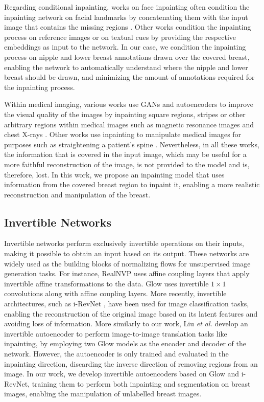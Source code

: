 Regarding conditional inpainting, works on face inpainting often condition the inpainting network on facial landmarks by concatenating them with the input image that contains the missing regions \cite{sun2018natural, yang2020generative, hong2024conditional}. Other works condition the inpainting process on reference images \cite{lim2023image} or on textual cues \cite{xie2023smartbrush} by providing the respective embeddings as input to the network. In our case, we condition the inpainting process on nipple and lower breast annotations drawn over the covered breast, enabling the network to automatically understand where the nipple and lower breast should be drawn, and minimizing the amount of annotations required for the inpainting process. 

Within medical imaging, various works use GANs and autoencoders to improve the visual quality of the images by inpainting square regions, stripes or other arbitrary regions within medical images such as magnetic resonance images \cite{armanious2019adversarial, chai2020mri, armanious2020ipa} and chest X-rays \cite{tran2020deep}. Other works use inpainting to manipulate medical images for purposes such as straightening a patient's spine \cite{bukas2021patient}. Nevertheless, in all these works, the information that is covered in the input image, which may be useful for a more faithful reconstruction of the image, is not provided to the model and is, therefore, lost. In this work, we propose an inpainting model that uses information from the covered breast region to inpaint it, enabling a more realistic reconstruction and manipulation of the breast. 

\subsection{Invertible Networks}

Invertible networks perform exclusively invertible operations on their inputs, making it possible to obtain an input based on its output. These networks are widely used as the building blocks of normalizing flows \cite{rezende2015variational} for unsupervised image generation tasks. For instance, RealNVP \cite{dinh2017density} uses affine coupling layers that apply invertible affine transformations to the data. Glow \cite{kingma2018glow} uses invertible $1\times 1$ convolutions along with affine coupling layers. More recently, invertible architectures, such as i-RevNet \cite{jacobsen2018irevnet}, have been used for image classification tasks, enabling the reconstruction of the original image based on its latent features and avoiding loss of information. 
More similarly to our work, Liu \textit{et al.} \cite{liu2020deep} develop an invertible autoencoder to perform image-to-image translation tasks like inpainting, by employing two Glow models as the encoder and decoder of the network. However, the autoencoder is only trained and evaluated in the inpainting direction, discarding the inverse direction of removing regions from an image. In our work, we develop invertible autoencoders based on Glow and i-RevNet, training them to perform both inpainting and segmentation on breast images, enabling the manipulation of unlabelled breast images.